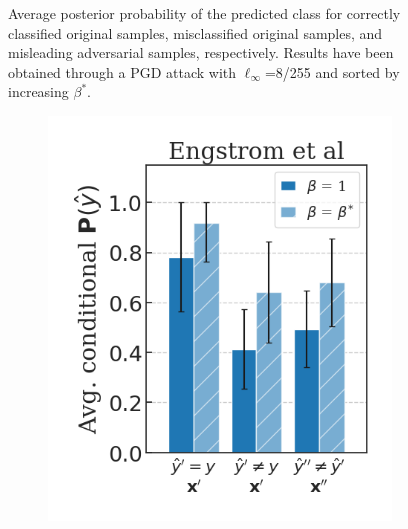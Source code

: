 \begin{figure}[H]
\begin{subfigure}[b]{0.3\textwidth}
    \end{subfigure}
   
    \caption{Average posterior probability of the predicted class for 
    correctly classified original samples, misclassified original samples, and 
    misleading adversarial samples, respectively. Results have been obtained through a PGD attack with 
    $\ell_\infty$=8/255 and sorted by increasing $\beta^{*}$.}
    \label{fig:appendix_adversarial_distribution_pgd}
\end{figure}

\begin{figure}[H]
    \centering
    \begin{subfigure}[b]{0.3\textwidth}
        \centering
        \includegraphics[width=\textwidth]{img/results_discussion/adversarial/Engstrom2019Robustness_short_FMN_0.png}
    \end{subfigure}
    \begin{subfigure}[b]{0.3\textwidth}
        \centering

\end{subfigure}
\end{figure}
